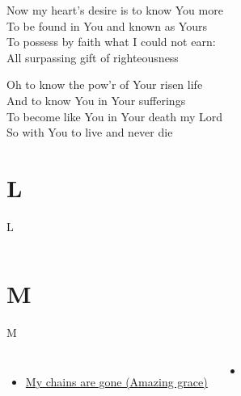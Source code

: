 \documentclass{beamer}
\begin{document}
{\begin{frame}{}
\end{frame}

\hypertarget{Knowing You['All I once held dear']2}{}
\begin{frame}{}
\fontsize{ 18 }{ 23 }\selectfont

Now my heart's desire is to know You more\\ 
To be found in You and known as Yours\\ 
To possess by faith what I could not earn:\\ 
All surpassing gift of righteousness 

\end{frame}

\hypertarget{Knowing You['All I once held dear']3}{}
\begin{frame}{}
\fontsize{ 18 }{ 23 }\selectfont

Oh to know the pow'r of Your risen life\\ 
And to know You in Your sufferings\\ 
To become like You in Your death my Lord\\ 
So with You to live and never die 

\end{frame}

}
\section{L}

\begin{frame}{L}
\begin{columns}

    


    


\end{columns}

\end{frame}

\section{M}

\begin{frame}{M}
\begin{columns}
        \begin{itemize}
    \item \hyperlink{Amazing grace['My chains are gone'](Tomlin)}{My chains are gone (Amazing grace)} \phantom{ 1}
\end{itemize}
        \begin{itemize}
            \item[] \phantom{1}\end{itemize}


\end{columns}

\end{frame}
\end{document}
